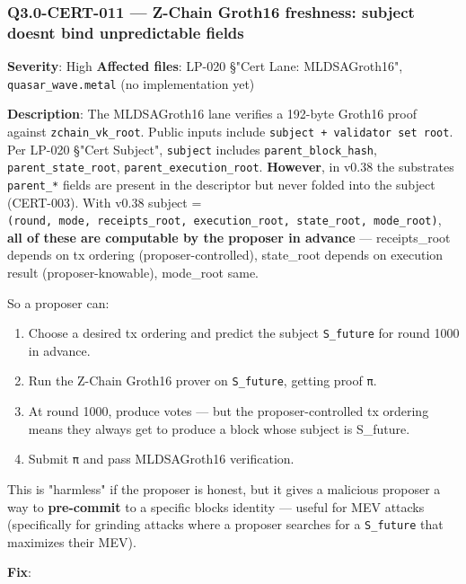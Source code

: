 \documentclass[
]{article}
\providecommand{\tightlist}{%
  \setlength{\itemsep}{0pt}\setlength{\parskip}{0pt}}
\begin{document}
\subsubsection{Q3.0-CERT-011 --- Z-Chain Groth16 freshness: subject
doesn\textquotesingle t bind unpredictable
fields}\label{q30-cert-011--z-chain-groth16-freshness-subject-doesnt-bind-unpredictable-fields}

\textbf{Severity}: High \textbf{Affected files}: LP-020 §"Cert Lane:
MLDSAGroth16", \texttt{quasar\_wave.metal} (no implementation yet)

\textbf{Description}: The MLDSAGroth16 lane verifies a 192-byte Groth16
proof against \texttt{zchain\_vk\_root}. Public inputs include
\texttt{subject\ +\ validator\ set\ root}. Per LP-020 §"Cert Subject",
\texttt{subject} includes \texttt{parent\_block\_hash},
\texttt{parent\_state\_root}, \texttt{parent\_execution\_root}.
\textbf{However}, in v0.38 the substrate\textquotesingle s
\texttt{parent\_*} fields are present in the descriptor but never folded
into the subject (CERT-003). With v0.38 subject =
\texttt{(round,\ mode,\ receipts\_root,\ execution\_root,\ state\_root,\ mode\_root)},
\textbf{all of these are computable by the proposer in advance} ---
receipts\_root depends on tx ordering (proposer-controlled), state\_root
depends on execution result (proposer-knowable), mode\_root same.

So a proposer can:

\begin{enumerate}
\def\labelenumi{\arabic{enumi}.}
\tightlist
\item
  Choose a desired tx ordering and predict the subject
  \texttt{S\_future} for round 1000 in advance.
\item
  Run the Z-Chain Groth16 prover on \texttt{S\_future}, getting proof
  \texttt{π}.
\item
  At round 1000, produce votes --- but the proposer-controlled tx
  ordering means they always get to produce a block whose subject is
  S\_future.
\item
  Submit \texttt{π} and pass MLDSAGroth16 verification.
\end{enumerate}

This is "harmless" if the proposer is honest, but it gives a malicious
proposer a way to \textbf{pre-commit} to a specific
block\textquotesingle s identity --- useful for MEV attacks
(specifically for grinding attacks where a proposer searches for a
\texttt{S\_future} that maximizes their MEV).

\textbf{Fix}:
\end{document}
